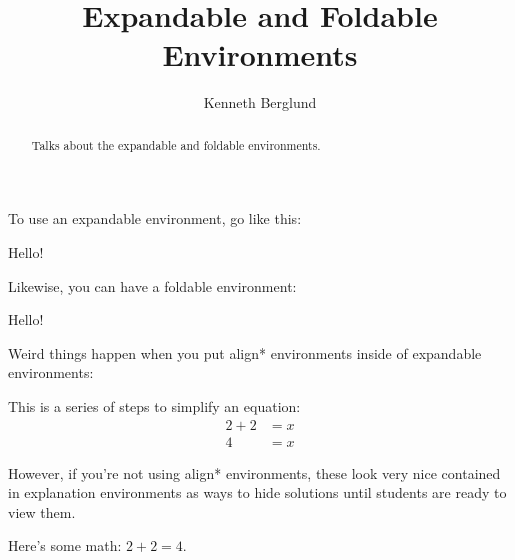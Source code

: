 \documentclass{ximera}
\title{Expandable and Foldable Environments}
\author{Kenneth Berglund}
\begin{document}
\begin{abstract}
Talks about the expandable and foldable environments. 
\end{abstract}
\maketitle

To use an expandable environment, go like this:
\begin{expandable}
Hello!
\end{expandable}

Likewise, you can have a foldable environment:
\begin{foldable}
Hello!
\end{foldable}

Weird things happen when you put align* environments inside of expandable environments:

\begin{expandable}
This is a series of steps to simplify an equation:
\begin{align*}
2 + 2 & = x \\
4 & = x
\end{align*}
\end{expandable}

However, if you're not using align* environments, these look very nice contained in explanation environments as ways to hide solutions until students are ready to view them. 
\begin{explanation}
	\begin{expandable}
		Here's some math: $2 + 2 = 4$. 
	\end{expandable}
\end{explanation}
\end{document}
